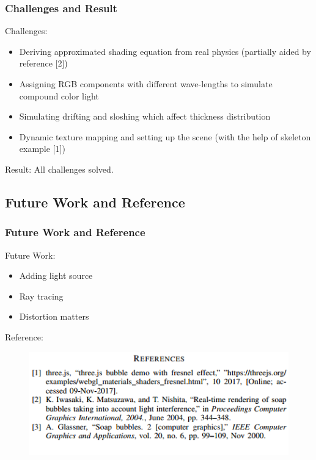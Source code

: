 \documentclass{beamer}
\begin{document}
\begin{frame}
	\frametitle{Challenges and Result}
	Challenges:
	\begin{itemize}
	\item Deriving approximated shading equation from real physics (partially aided by reference [2])
	\item Assigning RGB components with different wave-lengths to simulate compound color light
	\item Simulating drifting and sloshing which affect thickness distribution
	\item Dynamic texture mapping and setting up the scene (with the help of skeleton example [1])
	\end{itemize}
	Result:
	All challenges solved.
\end{frame}


\subsection{Future Work and Reference}

\begin{frame}
	\frametitle{Future Work and Reference}
	Future Work:
	\begin{itemize}
		\item Adding light source
		\item Ray tracing
		\item Distortion matters
	\end{itemize}
	Reference:
	\begin{figure}
		\centering
		\includegraphics[width=0.8\linewidth]{reference.png}
	\end{figure}
\end{frame}

\end{document}

